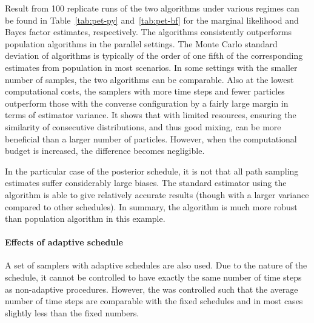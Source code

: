 Result from 100 replicate runs of the two algorithms under various regimes can be found in Table~\ref{tab:pet-py} and~\ref{tab:pet-bf} for the marginal likelihood and Bayes factor estimates, respectively. The \smc algorithms consistently outperforms population \mcmc algorithms in the parallel settings. The Monte Carlo standard deviation of \smc algorithms is typically of the order of one fifth of the corresponding estimates from population \mcmc in most scenarios. In some settings with the smaller number of samples, the two algorithms can be comparable. Also at the lowest computational costs, the samplers with more time steps and fewer particles outperform those with the converse configuration by a fairly large margin in terms of estimator variance. It shows that with limited resources, ensuring the similarity of consecutive distributions, and thus good mixing, can be more beneficial than a larger number of particles. However, when the computational budget is increased, the difference becomes negligible.

In the particular case of the posterior schedule, it is not  that all path sampling estimates suffer considerably large biases. The standard estimator using the \smc[2] algorithm is able to give relatively accurate results (though with a larger variance compared to other schedules). In summary, the \smc algorithm is much more robust than population \mcmc algorithm in this example.

\afterpage{\clearpage}
\afterpage{\clearpage}

\paragraph{Effects of adaptive schedule}

A set of samplers with adaptive schedules are also used. Due to the nature of the schedule, it cannot be controlled to have exactly the same number of time steps as non-adaptive procedures. However, the \cess was controlled such that the average number of time steps are comparable with the fixed schedules and in most cases slightly less than the fixed numbers.

